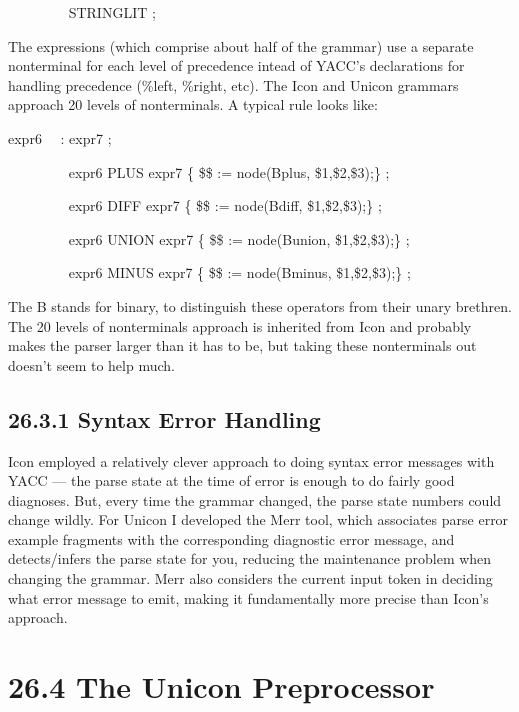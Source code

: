 {\ttfamily\mdseries
\ \ \ \ \ \ \ \ {\textbar} STRINGLIT ;}


The expressions (which comprise about half of the grammar) use a
separate nonterminal for each level of precedence intead of YACC's
declarations for handling precedence (\%left, \%right, etc). The Icon
and Unicon grammars approach 20 levels of nonterminals. A typical rule
looks like:

{\ttfamily\mdseries
expr6 \ \ : expr7 ;}

{\ttfamily\mdseries
\ \ \ \ \ \ \ \ {\textbar} expr6 PLUS expr7 \{ \$\$ := node({\textquotedbl}Bplus{\textquotedbl}, \$1,\$2,\$3);\} ;}

{\ttfamily\mdseries
\ \ \ \ \ \ \ \ {\textbar} expr6 DIFF expr7 \{ \$\$ := node({\textquotedbl}Bdiff{\textquotedbl}, \$1,\$2,\$3);\} ;}

{\ttfamily\mdseries
\ \ \ \ \ \ \ \ {\textbar} expr6 UNION expr7 \{ \$\$ := node({\textquotedbl}Bunion{\textquotedbl}, \$1,\$2,\$3);\} ;}

{\ttfamily\mdseries
\ \ \ \ \ \ \ \ {\textbar} expr6 MINUS expr7 \{ \$\$ := node({\textquotedbl}Bminus{\textquotedbl}, \$1,\$2,\$3);\} ;}


The {\textquotedbl}B{\textquotedbl} stands for
{\textquotedbl}binary{\textquotedbl}, to distinguish these operators
from their unary brethren. The 20 levels of nonterminals approach is
inherited from Icon and probably makes the parser larger than it has
to be, but taking these nonterminals out doesn't seem to help much.

\subsection[26.3.1 Syntax Error Handling]{26.3.1 Syntax Error Handling}

Icon employed a relatively clever approach to doing syntax error
messages with YACC --- the parse state at the time of error is enough
to do fairly good diagnoses. But, every time the grammar changed, the
parse state numbers could change wildly. For Unicon I developed the
Merr tool, which associates parse error example fragments with the
corresponding diagnostic error message, and detects/infers the parse
state for you, reducing the maintenance problem when changing the
grammar. Merr also considers the current input token in deciding what
error message to emit, making it fundamentally more precise than
Icon's approach.

\section[26.4 The Unicon Preprocessor]{26.4 The Unicon Preprocessor}

